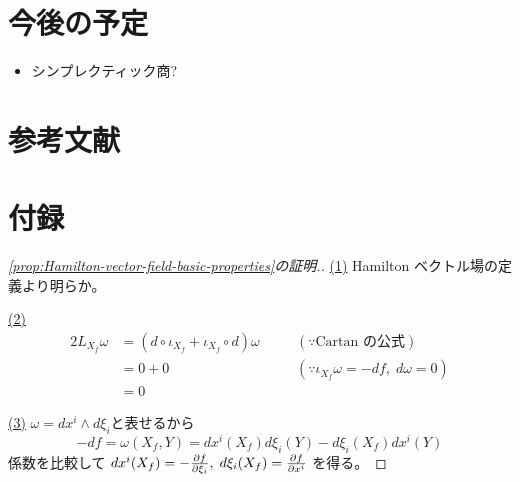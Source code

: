 \documentclass[report,dvipdfmx]{jlreq}
\begin{document}
%
\section*{今後の予定}

\begin{itemize}
    \item シンプレクティック商?
\end{itemize}

%
\section*{参考文献}

\nocite{_bayes_2020}
\nocite{BB19061613}
\nocite{BB13785508}

{
    \renewcommand{\bibsection}{}
    
    
}

%
\newpage
\appendix
\renewcommand\thesection{\Alph{section}}
\setcounter{section}{0}
\section{付録}

\begin{proof}[\cref{prop:Hamilton-vector-field-basic-properties}の証明.]
    \uline{(1)} \quad
    Hamilton ベクトル場の定義より明らか。

    \uline{(2)} \quad
    \begin{alignat}{2}
        L_{X_f} \omega
            &=
                (d \circ \iota_{X_f} + \iota_{X_f} \circ d) \omega
                \quad
                &&(\because \text{Cartan の公式})
                \\
            &=
                0 + 0
                \quad
                &&(\because \iota_{X_f} \omega = -df, \; d \omega = 0)
                \\
            &=
                0
    \end{alignat}

    \uline{(3)} \quad
    $\omega = dx^i \wedge d\xi_i$と表せるから
    \begin{equation}
        - df
            =
                \omega(X_f, Y)
            =
                dx^i(X_f) d\xi_i(Y)
                - d\xi_i(X_f) dx^i(Y)
    \end{equation}
    係数を比較して
    $dx^i(X_f) = - \deldel[f]{\xi_i}, \;
        d\xi_i(X_f) = \deldel[f]{x^i}$
    を得る。
\end{proof}
\end{document}
